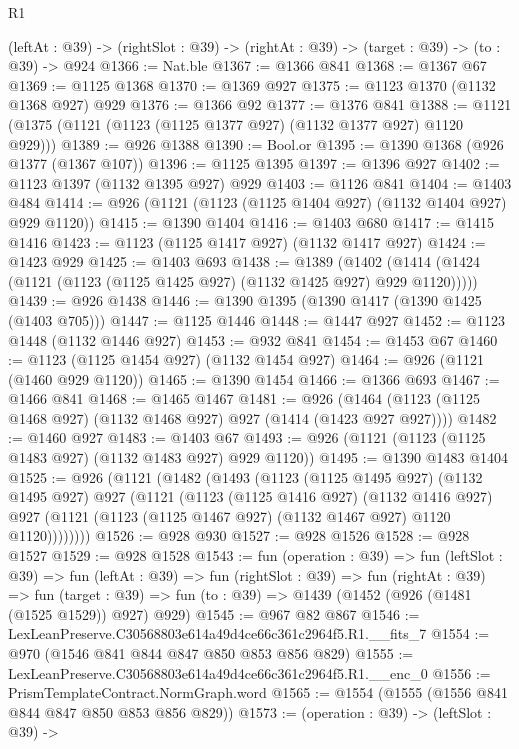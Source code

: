 \begin{lexlean}{R1}
\begin{coremodule}
  (leftAt : @39) -> (rightSlot : @39) -> (rightAt : @39) -> (target : @39) -> (to : @39) -> @924
@1366 := Nat.ble
@1367 := @1366 @841
@1368 := @1367 @67
@1369 := @1125 @1368
@1370 := @1369 @927
@1375 := @1123 @1370 (@1132 @1368 @927) @929
@1376 := @1366 @92
@1377 := @1376 @841
@1388 := @1121 (@1375 (@1121 (@1123 (@1125 @1377 @927) (@1132 @1377 @927) @1120 @929)))
@1389 := @926 @1388
@1390 := Bool.or
@1395 := @1390 @1368 (@926 @1377 (@1367 @107))
@1396 := @1125 @1395
@1397 := @1396 @927
@1402 := @1123 @1397 (@1132 @1395 @927) @929
@1403 := @1126 @841
@1404 := @1403 @484
@1414 := @926 (@1121 (@1123 (@1125 @1404 @927) (@1132 @1404 @927) @929 @1120))
@1415 := @1390 @1404
@1416 := @1403 @680
@1417 := @1415 @1416
@1423 := @1123 (@1125 @1417 @927) (@1132 @1417 @927)
@1424 := @1423 @929
@1425 := @1403 @693
@1438 := @1389
    (@1402 (@1414 (@1424 (@1121 (@1123 (@1125 @1425 @927) (@1132 @1425 @927) @929 @1120)))))
@1439 := @926 @1438
@1446 := @1390 @1395 (@1390 @1417 (@1390 @1425 (@1403 @705)))
@1447 := @1125 @1446
@1448 := @1447 @927
@1452 := @1123 @1448 (@1132 @1446 @927)
@1453 := @932 @841
@1454 := @1453 @67
@1460 := @1123 (@1125 @1454 @927) (@1132 @1454 @927)
@1464 := @926 (@1121 (@1460 @929 @1120))
@1465 := @1390 @1454
@1466 := @1366 @693
@1467 := @1466 @841
@1468 := @1465 @1467
@1481 := @926 (@1464 (@1123 (@1125 @1468 @927) (@1132 @1468 @927) @927 (@1414 (@1423 @927 @927))))
@1482 := @1460 @927
@1483 := @1403 @67
@1493 := @926 (@1121 (@1123 (@1125 @1483 @927) (@1132 @1483 @927) @929 @1120))
@1495 := @1390 @1483 @1404
@1525 := @926
    (@1121
      (@1482
        (@1493
          (@1123
            (@1125 @1495 @927)
            (@1132 @1495 @927)
            @927
            (@1121
              (@1123
                (@1125 @1416 @927)
                (@1132 @1416 @927)
                @927
                (@1121 (@1123 (@1125 @1467 @927) (@1132 @1467 @927) @1120 @1120))))))))
@1526 := @928 @930
@1527 := @928 @1526
@1528 := @928 @1527
@1529 := @928 @1528
@1543 := fun (operation : @39) =>
  fun (leftSlot : @39) =>
  fun (leftAt : @39) =>
  fun (rightSlot : @39) =>
  fun (rightAt : @39) =>
  fun (target : @39) => fun (to : @39) => @1439 (@1452 (@926 (@1481 (@1525 @1529)) @927) @929)
@1545 := @967 @82 @867
@1546 := LexLeanPreserve.C30568803e614a49d4ce66c361c2964f5.R1.__fits_7
@1554 := @970 (@1546 @841 @844 @847 @850 @853 @856 @829)
@1555 := LexLeanPreserve.C30568803e614a49d4ce66c361c2964f5.R1.__enc_0
@1556 := PrismTemplateContract.NormGraph.word
@1565 := @1554 (@1555 (@1556 @841 @844 @847 @850 @853 @856 @829))
@1573 := (operation : @39) ->
  (leftSlot : @39) ->

\end{coremodule}
\end{lexlean}
